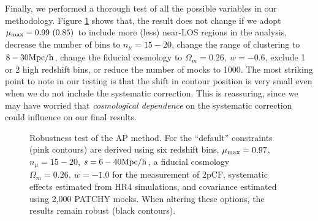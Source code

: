 \documentclass[prl,twocolumn,superscriptaddress,aps,amsmath,amssymb,nofootinbib,altaffilletter]{revtex4}
\begin{document}
Finally, we performed a thorough test of all the possible variables in our methodology.
Figure \ref{fig_contest} shows that,
the result does not change if 
we adopt $\mu_{\rm max}=0.99\ (0.85)$ to include more (less) near-LOS regions in the analysis,
decrease the number of bins to $n_{\mu}=15-20$,
change the range of clustering to $8-30 \rm Mpc/h$,
change the fiducial cosmology to $\Omega_m=0.26,\ w=-0.6$,
exclude 1 or 2 high redshift bins,
or reduce the number of mocks to 1000.
The most striking point to note in our testing is that the 
shift in contour position is very small even when we do not include the systematic correction.
This is reassuring, since we may have worried that {\it cosmological dependence} on the systematic correction could influence on our final results. 


\begin{figure}
   \caption{\label{fig_contest}
   Robustness test of the AP method. 
   For the ``default'' constraints (pink contours) are derived using six redshift bins, 
   $\mu_{\rm max}=0.97$, $n_{\mu}=15-20$, $s=6-40 \rm Mpc/h$,
   a fiducial cosmology $\Omega_m=0.26,\ w=-1.0$ for the measurement of 2pCF,
   systematic effects estimated from HR4 simulations, 
   and covariance estimated using 2,000 PATCHY mocks.
   When altering these options, the results remain robust (black contours).
   }
\end{figure}
\end{document}
